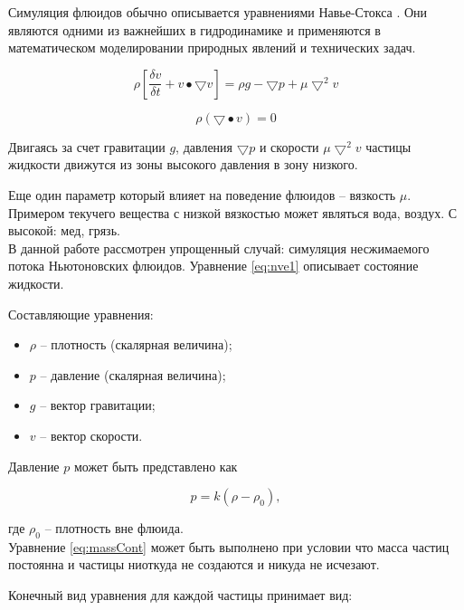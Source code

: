 Симуляция флюидов обычно описывается уравнениями Навье-Стокса \cite{sphHarada}.
Они являются одними из важнейших в гидродинамике и применяются в математическом
моделировании природных явлений и технических задач.

\begin{equation}
\label{eq:nve1}
  \rho[\frac{\delta{}v}{\delta{}t} + v \bullet \bigtriangledown{}v] = \rho{}g - \bigtriangledown{}p + \mu{}\bigtriangledown^2v
\end{equation}

\begin{equation}
\label{eq:massCont}
  \rho(\bigtriangledown\bullet{}v) = 0
\end{equation}

Двигаясь за счет гравитации $g$, давления $\bigtriangledown{}p$ и скорости $\mu\bigtriangledown^2v$ частицы жидкости движутся из зоны высокого давления в зону низкого.

Еще один параметр который влияет на поведение флюидов -- вязкость $\mu$.
Примером текучего вещества с низкой вязкостью может являться вода, воздух.
С высокой: мед, грязь. \\

В данной работе рассмотрен упрощенный случай: симуляция несжимаемого потока
Ньютоновских флюидов. Уравнение \eqref{eq:nve1} описывает состояние жидкости.

Составляющие уравнения:

\begin{itemize}
  \item $\rho$ -- плотность (скалярная величина);
  \item $p$ -- давление (скалярная величина);
  \item $g$ -- вектор гравитации;
  \item $v$ -- вектор скорости.
\end{itemize}

Давление $p$ может быть представлено как

\begin{equation}
\label{eq:pressure}
  p = k(\rho - \rho_0),
\end{equation}

где $\rho_0$ -- плотность вне флюида. \\

Уравнение \eqref{eq:massCont} может быть выполнено при условии что масса частиц
постоянна и частицы ниоткуда не создаются и никуда не исчезают.

Конечный вид уравнения для каждой частицы принимает вид:


